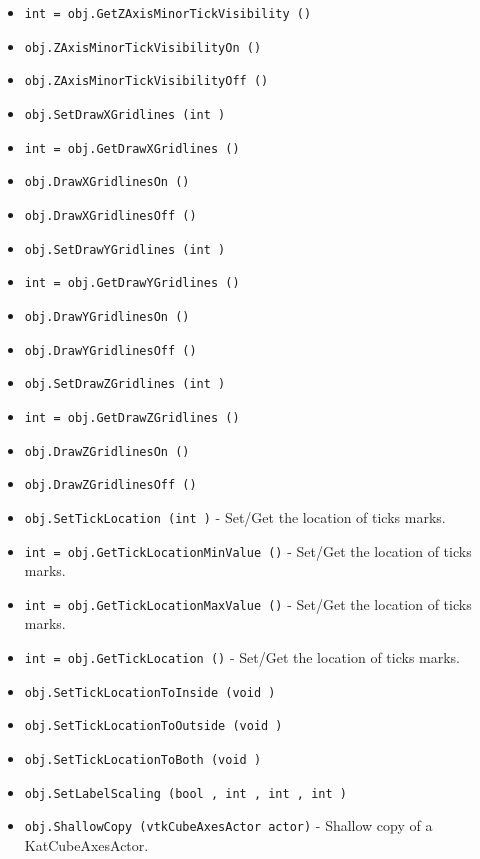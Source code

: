 \begin{itemize}
\item  \verb|int = obj.GetZAxisMinorTickVisibility ()|

\item  \verb|obj.ZAxisMinorTickVisibilityOn ()|

\item  \verb|obj.ZAxisMinorTickVisibilityOff ()|

\item  \verb|obj.SetDrawXGridlines (int )|

\item  \verb|int = obj.GetDrawXGridlines ()|

\item  \verb|obj.DrawXGridlinesOn ()|

\item  \verb|obj.DrawXGridlinesOff ()|

\item  \verb|obj.SetDrawYGridlines (int )|

\item  \verb|int = obj.GetDrawYGridlines ()|

\item  \verb|obj.DrawYGridlinesOn ()|

\item  \verb|obj.DrawYGridlinesOff ()|

\item  \verb|obj.SetDrawZGridlines (int )|

\item  \verb|int = obj.GetDrawZGridlines ()|

\item  \verb|obj.DrawZGridlinesOn ()|

\item  \verb|obj.DrawZGridlinesOff ()|

\item  \verb|obj.SetTickLocation (int )| -  Set/Get the location of ticks marks. 

\item  \verb|int = obj.GetTickLocationMinValue ()| -  Set/Get the location of ticks marks. 

\item  \verb|int = obj.GetTickLocationMaxValue ()| -  Set/Get the location of ticks marks. 

\item  \verb|int = obj.GetTickLocation ()| -  Set/Get the location of ticks marks. 

\item  \verb|obj.SetTickLocationToInside (void )|

\item  \verb|obj.SetTickLocationToOutside (void )|

\item  \verb|obj.SetTickLocationToBoth (void )|

\item  \verb|obj.SetLabelScaling (bool , int , int , int )|

\item  \verb|obj.ShallowCopy (vtkCubeAxesActor actor)| -  Shallow copy of a KatCubeAxesActor.

\end{itemize}
